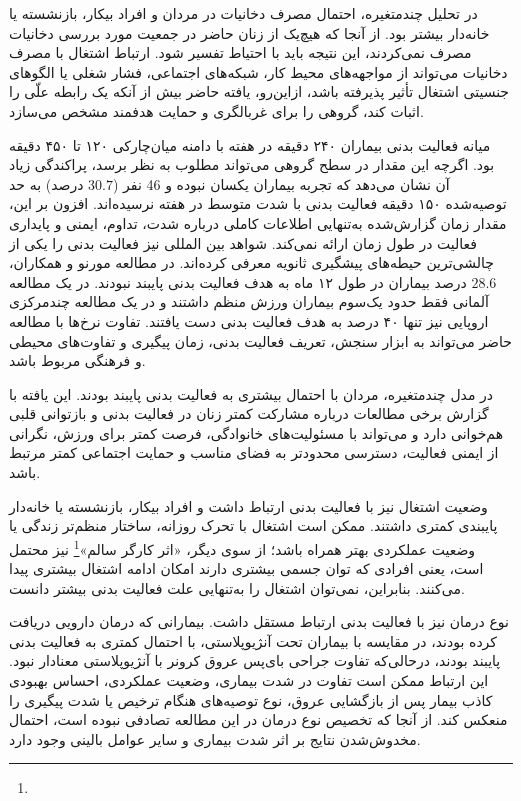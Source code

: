در تحلیل چندمتغیره، احتمال مصرف دخانیات در مردان و افراد بیکار، بازنشسته یا خانه‌دار بیشتر بود. از آنجا که هیچ‌یک از زنان حاضر در جمعیت مورد بررسی دخانیات مصرف نمی‌کردند، این نتیجه باید با احتیاط تفسیر شود. ارتباط اشتغال با مصرف دخانیات می‌تواند از مواجهه‌های محیط کار، شبکه‌های اجتماعی، فشار شغلی یا الگوهای جنسیتی اشتغال تأثیر پذیرفته باشد، ازاین‌رو، یافته حاضر بیش از آنکه یک رابطه علّی را اثبات کند، گروهی را برای غربالگری و حمایت هدفمند مشخص می‌سازد.

میانه فعالیت بدنی بیماران ۲۴۰ دقیقه در هفته با دامنه میان‌چارکی ۱۲۰ تا ۴۵۰ دقیقه بود. اگرچه این مقدار در سطح گروهی می‌تواند مطلوب به نظر برسد، پراکندگی زیاد آن نشان می‌دهد که تجربه بیماران یکسان نبوده و 46 نفر ($30.7$ درصد) به حد توصیه‌شده ۱۵۰ دقیقه فعالیت بدنی با شدت متوسط در هفته نرسیده‌اند. افزون بر این، مقدار زمان گزارش‌شده به‌تنهایی اطلاعات کاملی درباره شدت، تداوم، ایمنی و پایداری فعالیت در طول زمان ارائه نمی‌کند. شواهد بین المللی نیز فعالیت بدنی را یکی از چالشی‌ترین حیطه‌های پیشگیری ثانویه معرفی کرده‌اند. در مطالعه مورنو و همکاران، $28.6$ درصد بیماران در طول ۱۲ ماه به هدف فعالیت بدنی پایبند نبودند\cite{Moreno2024NonAdherence}. در یک مطالعه آلمانی فقط حدود یک‌سوم بیماران ورزش منظم داشتند\cite{Zeymer2024PatientKnowledge} و در یک مطالعه چند‌مرکزی اروپایی نیز تنها ۴۰ درصد به هدف فعالیت بدنی دست یافتند\cite{DeBacquer2022Lifestyle}. تفاوت نرخ‌ها با مطالعه حاضر می‌تواند به ابزار سنجش، تعریف فعالیت بدنی، زمان پیگیری و تفاوت‌های محیطی و فرهنگی مربوط باشد.

در مدل چندمتغیره، مردان با احتمال بیشتری به فعالیت بدنی پایبند بودند. این یافته با گزارش برخی مطالعات درباره مشارکت کمتر زنان در فعالیت بدنی و بازتوانی قلبی هم‌خوانی دارد\cite{Moreno2024NonAdherence,DeBacquer2022Lifestyle,DibaoDina2018Adherence} و می‌تواند با مسئولیت‌های خانوادگی، فرصت کمتر برای ورزش، نگرانی از ایمنی فعالیت، دسترسی محدودتر به فضای مناسب و حمایت اجتماعی کمتر مرتبط باشد.

وضعیت اشتغال نیز با فعالیت بدنی ارتباط داشت و افراد بیکار، بازنشسته یا خانه‌دار پایبندی کمتری داشتند. ممکن است اشتغال با تحرک روزانه، ساختار منظم‌تر زندگی یا وضعیت عملکردی بهتر همراه باشد؛ از سوی دیگر، «اثر کارگر سالم»\footnote{} نیز محتمل است، یعنی افرادی که توان جسمی بیشتری دارند امکان ادامه اشتغال بیشتری پیدا می‌کنند. بنابراین، نمی‌توان اشتغال را به‌تنهایی علت فعالیت بدنی بیشتر دانست.

نوع درمان نیز با فعالیت بدنی ارتباط مستقل داشت. بیمارانی که درمان دارویی دریافت کرده بودند، در مقایسه با بیماران تحت آنژیوپلاستی، با احتمال کمتری به فعالیت بدنی پایبند بودند، درحالی‌که تفاوت جراحی بای‌پس عروق کرونر با آنژیوپلاستی معنادار نبود. این ارتباط ممکن است تفاوت در شدت بیماری، وضعیت عملکردی، احساس بهبودی کاذب بیمار پس از بازگشایی عروق، نوع توصیه‌های هنگام ترخیص یا شدت پیگیری را منعکس کند. از آنجا که تخصیص نوع درمان در این مطالعه تصادفی نبوده است، احتمال مخدوش‌شدن نتایج بر اثر شدت بیماری و سایر عوامل بالینی وجود دارد.

